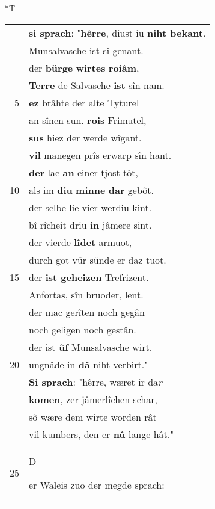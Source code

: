 \documentclass[8pt,a4paper,notitlepage]{article}
\begin{document}
\begin{table}[ht]
\begin{minipage}[t]{0.5\linewidth}
\end{minipage}
\hspace{0.5cm}
\begin{minipage}[t]{0.5\linewidth}
\small
\begin{center}*T
\end{center}
\begin{tabular}{rl}
 & \textbf{si sprach}: "\textbf{hêrre}, diust iu \textbf{niht bekant}.\\ 
 & Munsalvasche ist si genant.\\ 
 & der \textbf{bürge} \textbf{wirtes} \textbf{roiâm},\\ 
 & \textbf{Terre} de Salvasche \textbf{ist} sîn nam.\\ 
5 & \textbf{ez} brâhte der alte Tyturel\\ 
 & an sînen sun. \textbf{rois} Frimutel,\\ 
 & \textbf{sus} hiez der werde wîgant.\\ 
 & \textbf{vil} manegen prîs erwarp sîn hant.\\ 
 & \textbf{der} lac \textbf{an} einer tjost tôt,\\ 
10 & als im \textbf{diu} \textbf{minne} \textbf{dar} gebôt.\\ 
 & der selbe lie vier werdiu kint.\\ 
 & bî rîcheit driu \textbf{in} jâmere sint.\\ 
 & der vierde \textbf{lîdet} armuot,\\ 
 & durch got vür sünde er daz tuot.\\ 
15 & der \textbf{ist geheizen} Trefrizent.\\ 
 & Anfortas, sîn bruoder, lent.\\ 
 & der mac gerîten noch gegân\\ 
 & noch geligen noch gestân.\\ 
 & der ist \textbf{ûf} Munsalvasche wirt.\\ 
20 & ungnâde in \textbf{dâ} niht verbirt."\\ 
 & \textbf{Si sprach}: "hêrre, wæret ir da\textit{r}\\ 
 & \textbf{komen}, zer jâmerlîchen schar,\\ 
 & sô wære dem wirte worden rât\\ 
 & vil kumbers, den er \textbf{nû} lange hât."\\ 
25 & \begin{large}D\end{large}er Waleis zuo der megde sprach:\\ 

\end{tabular}
\end{minipage}
\end{table}
\end{document}
